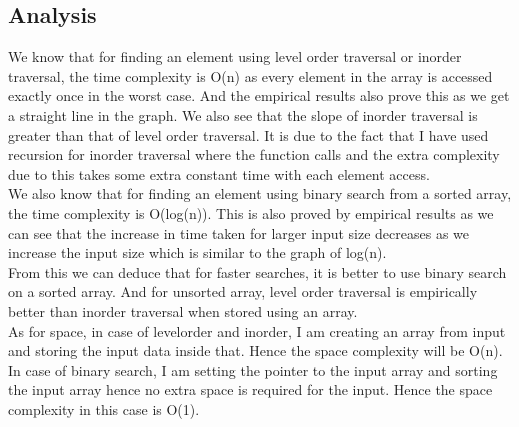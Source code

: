 \documentclass[12pt, letterpaper]{article}
\begin{document}
\subsection{Analysis}
\label{sec:analysis}
We know that for finding an element using level order traversal or inorder traversal, the time complexity is O(n) as every element in the array is accessed exactly once in the worst case. And the empirical results also prove this as we get a straight line in the graph. We also see that the slope of inorder traversal is greater than that of level order traversal. It is due to the fact that I have used recursion for inorder traversal where the function calls and the extra complexity due to this takes some extra constant time with each element access.\\

We also know that for finding an element using binary search from a sorted array, the time complexity is O(log(n)). This is also proved by empirical results as we can see that the increase in time taken for larger input size decreases as we increase the input size which is similar to the graph of log(n).\\

From this we can deduce that for faster searches, it is better to use binary search on a sorted array. And for unsorted array, level order traversal is empirically better than inorder traversal when stored using an array.\\

As for space, in case of levelorder and inorder, I am creating an array from input and storing the input data inside that. Hence the space complexity will be O(n). In case of binary search, I am setting the pointer to the input array and sorting the input array hence no extra space is required for the input. Hence the space complexity in this case is O(1).
\end{document}
